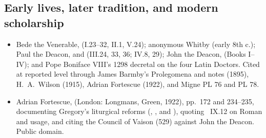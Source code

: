 \subsection*{Early lives, later tradition, and modern scholarship}

\begin{itemize}
\item Bede the Venerable, 
(I.23--32, II.1, V.24); anonymous Whitby  (early 8th c.);
Paul the Deacon,  and 
(III.24, 33, 36; IV.8, 29); John the Deacon,  (Books
I--IV); and Pope Boniface VIII's 1298 decretal on the four Latin Doctors. Cited
at reported level through James Barmby's Prolegomena and notes (1895),
H.\ A.\ Wilson (1915), Adrian Fortescue (1922), and Migne PL 76 and PL 78.
\item Adrian Fortescue,  (London:
Longmans, Green, 1922), pp.~172 and 234--235, documenting Gregory's liturgical
reforms (, , and ),
quoting \ IX.12 on Roman  and 
usage, and citing the Council of Vaison (529) against John the Deacon. Public
domain.
\end{itemize}

\endgroup
